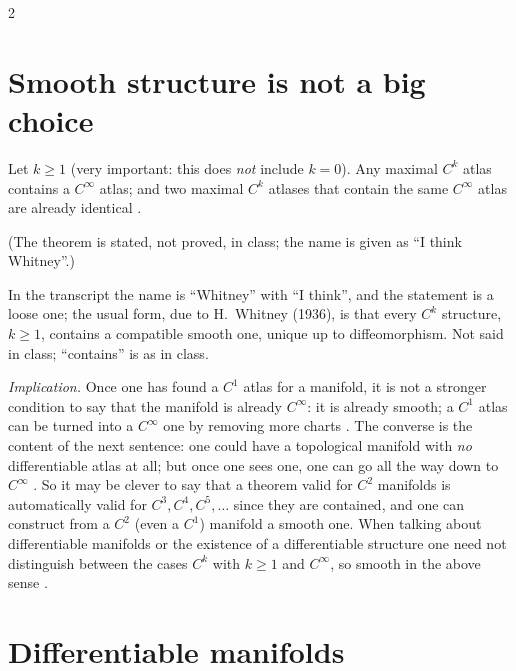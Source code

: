 \begin{paracol}{2}
\section{Smooth structure is not a big choice}\label{sec:df-whitney}

\begin{theorem}[Whitney]\label{thm:df-whitney}
Let $k\ge1$ (very important: this does \emph{not} include $k=0$). Any maximal $C^k$ atlas contains a $C^\infty$ atlas; and two maximal $C^k$ atlases that contain the same $C^\infty$ atlas are already identical
.
\end{theorem}
(The theorem is stated, not proved, in class; the name is given as ``I think Whitney''.)
\begin{coursenote}
In the transcript the name is ``Whitney'' with ``I think'', and the statement is a loose one; the usual form, due to H.~Whitney (1936), is that every $C^k$ structure, $k\ge1$, contains a compatible smooth one, unique up to diffeomorphism.
Not said in class; ``contains'' is as in class.
\end{coursenote}
\emph{Implication.} Once one has found a $C^1$ atlas for a manifold, it is not a stronger condition to say that the manifold is already $C^\infty$: it is already smooth; a $C^1$ atlas can be turned into a $C^\infty$ one by removing more charts .
The converse is the content of the next sentence: one could have a topological manifold with \emph{no} differentiable atlas at all; but once one sees one, one can go all the way down to $C^\infty$ . So it may be clever to say that a theorem valid for $C^2$ manifolds is automatically valid for
$C^3,C^4,C^5,\dots$ since they are contained, and one can construct from a $C^2$ (even a $C^1$) manifold a smooth one. When talking about differentiable manifolds or the existence of a differentiable structure one need not distinguish between the cases $C^k$ with $k\ge1$ and $C^\infty$, so
smooth in the above sense .

\section{Differentiable manifolds}\label{sec:df-manifold}


\end{paracol}
